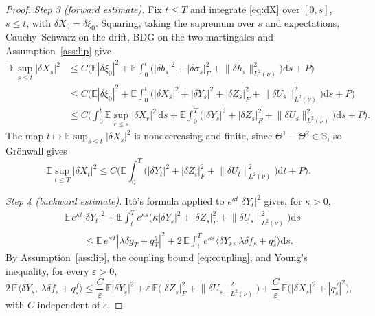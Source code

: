 \documentclass[preprint,12pt]{elsarticle}
\newcommand{\E}{\mathbb{E}}
\newcommand{\diff}{\mathrm{d}}
\newcommand{\inner}[2]{\langle #1,\,#2\rangle}
\newcommand{\Lnu}{L^2(\nu)}
\newcommand{\HH}{\mathbb{S}}
\newcommand{\Lnorm}[1]{\lVert #1\rVert_{\Lnu}}
\numberwithin{equation}{section}
\theoremstyle{plain}
\theoremstyle{definition}
\theoremstyle{\PaperRemarkStyle}
\begin{document}
\begin{proof}
\emph{Step 3 (forward estimate).} Fix $t\le T$ and integrate \eqref{eq:dX} over $[0,s]$,
$s\le t$, with $\delta X_0=\delta\xi_0$. Squaring, taking the supremum over $s$ and
expectations, Cauchy--Schwarz on the drift, BDG on the two martingales and
Assumption~\ref{ass:lip} give
\[
\begin{aligned}
\E\sup_{s\le t}|\delta X_s|^2
&\le C\Big(\E|\delta\xi_0|^2+\E\!\int_0^t\!\big(|\delta b_s|^2+|\delta\sigma_s|_F^2+\Lnorm{\delta h_s}^2\big)\diff s+P\Big)\\
&\le C\Big(\E|\delta\xi_0|^2+\E\!\int_0^t\!\big(|\delta X_s|^2+|\delta Y_s|^2+|\delta Z_s|_F^2+\Lnorm{\delta U_s}^2\big)\diff s+P\Big)\\
&\le C\Big(\int_0^t\!\E\sup_{r\le s}|\delta X_r|^2\,\diff s
+\E\!\int_0^T\!\big(|\delta Y_s|^2+|\delta Z_s|_F^2+\Lnorm{\delta U_s}^2\big)\diff s+P\Big) .
\end{aligned}
\]
The map $t\mapsto\E\sup_{s\le t}|\delta X_s|^2$ is nondecreasing and finite, since
$\Theta^1-\Theta^2\in\HH$, so Gr\"onwall gives
\begin{equation}\label{eq:fwd}
\E\sup_{t\le T}|\delta X_t|^2\le C\Big(\E\!\int_0^T\!\big(|\delta Y_t|^2+|\delta Z_t|_F^2+\Lnorm{\delta U_t}^2\big)\diff t+P\Big).
\end{equation}

\emph{Step 4 (backward estimate).} It\^o's formula applied to $e^{\kappa t}|\delta Y_t|^2$
gives, for $\kappa>0$,
\begin{equation}\label{eq:bwdito}
\begin{aligned}
&\E\,e^{\kappa t}|\delta Y_t|^2
+\E\!\int_t^T\!e^{\kappa s}\big(\kappa|\delta Y_s|^2+|\delta Z_s|_F^2+\Lnorm{\delta U_s}^2\big)\diff s\\
&\qquad\le\E\,e^{\kappa T}|\lambda\delta g_T+q^g_T|^2
+2\,\E\!\int_t^T\!e^{\kappa s}\inner{\delta Y_s}{\lambda\delta f_s+q^f_s}\diff s .
\end{aligned}
\end{equation}
By Assumption~\ref{ass:lip}, the coupling bound \eqref{eq:coupling}, and Young's
inequality, for every $\varepsilon>0$,
\begin{equation}\label{eq:bwdyoung}
2\,\E\inner{\delta Y_s}{\lambda\delta f_s+q^f_s}
\le \frac C\varepsilon\,\E|\delta Y_s|^2+\varepsilon\,\E\big(|\delta Z_s|_F^2+\Lnorm{\delta U_s}^2\big)
+\frac C\varepsilon\,\E\big(|\delta X_s|^2+|q^f_s|^2\big),
\end{equation}
with $C$ independent of $\varepsilon$.


\end{proof}
\end{document}
